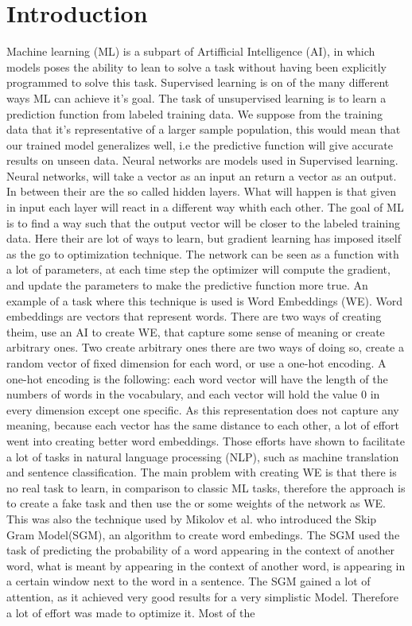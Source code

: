 \chapter{Introduction}\label{chap:introduction}


Machine learning (ML) is a subpart of Artifficial Intelligence (AI), in which models poses the ability to lean to solve a task without having been explicitly programmed to solve this task. Supervised learning is on of the many different ways ML can achieve it's goal. The task of unsupervised learning is to learn a prediction function from labeled training data. We suppose from the training data that it's representative of a larger sample population, this would mean that our trained model generalizes well, i.e the predictive function will give accurate results on unseen data. Neural networks are models used in Supervised learning. Neural networks, will take a vector as an input an return a vector as an output. In between their are the so called hidden layers. What will happen is that given in input each layer will react in a different way whith each other. The goal of ML is to find a way such that the output vector will be closer to the labeled training data. Here their are lot of ways to learn, but gradient learning has imposed itself as the go to optimization technique. The network can be seen as a function with a lot of parameters, at each time step the optimizer will compute the gradient, and update the parameters to make the predictive function more true. An example of a task where this technique is used is Word Embeddings (WE). Word embeddings are vectors that represent words. There are two ways of creating theim, use an AI to create WE, that capture some sense of meaning or create arbitrary ones. Two create arbitrary ones there are two ways of doing so, create a random vector of fixed dimension for each word, or use a one-hot encoding. A one-hot encoding is the following: each word vector will have the length of the numbers of words in the vocabulary, and each vector will hold the value 0 in every dimension except one specific. As this representation does not capture any meaning, because each vector has the same distance to each other, a lot of effort went into  creating better word embeddings. Those efforts have shown to facilitate a lot of tasks in natural language processing (NLP), such as machine translation and sentence classification. The main problem with creating WE is that there is no real task to learn, in comparison to classic ML tasks, therefore the approach is to create a fake task and then use the or some weights of the network as WE. This was also the technique used by Mikolov et al. who  introduced the Skip Gram Model(SGM), an algorithm to create word embedings. The SGM used the task of predicting the probability of a word appearing in the context of another word, what is meant by appearing in the context of another word, is appearing in a certain window next to the word in a sentence. The SGM gained a lot of attention, as it achieved very good results for a very simplistic Model. Therefore a lot of effort was made to optimize it. Most of the 